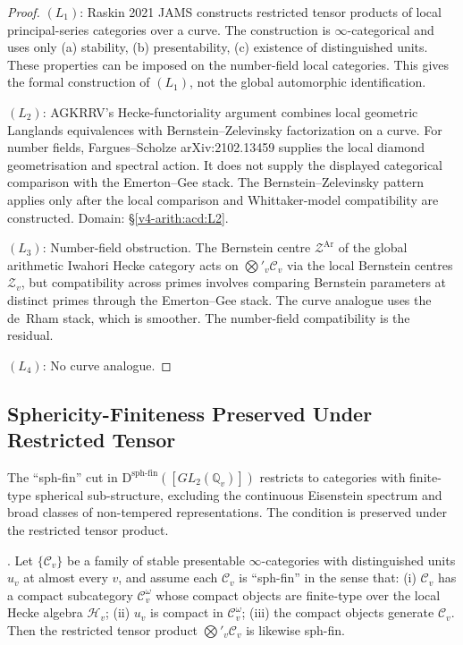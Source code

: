 \begin{proof}
\((L_{1})\): Raskin 2021 JAMS constructs restricted tensor products of
local principal-series categories over a curve. The construction is
\(\infty\)-categorical and uses only (a) stability, (b) presentability,
(c) existence of distinguished units. These properties can be imposed
on the number-field local categories. This gives the formal construction
of \((L_{1})\), not the global automorphic identification.

\((L_{2})\): AGKRRV's Hecke-functoriality argument combines local
geometric Langlands equivalences with Bernstein--Zelevinsky
factorization on a curve. For number fields,
Fargues--Scholze arXiv:2102.13459 supplies the local diamond
geometrisation and spectral action. It does not supply the displayed
categorical comparison with the Emerton--Gee stack. The
Bernstein--Zelevinsky pattern applies only after the local
comparison and Whittaker-model compatibility are constructed. Domain:
\S\ref{v4-arith:acd:L2}.

\((L_{3})\): Number-field obstruction. The Bernstein centre
\(\mathcal{Z}^{\mathrm{Ar}}\) of the global arithmetic Iwahori Hecke
category acts on \(\bigotimes'_{v}\mathcal{C}_{v}\) via the local
Bernstein centres \(\mathcal{Z}_{v}\), but compatibility across primes
involves comparing Bernstein parameters at distinct primes through
the Emerton--Gee stack. The curve analogue uses the de~Rham
stack, which is smoother. The number-field compatibility is the
residual.

\((L_{4})\): No curve analogue.
\end{proof}

\subsection{Sphericity-Finiteness Preserved Under Restricted Tensor}
\label{v4-arith:acd:obstruction-3}

The ``sph-fin'' cut in
\(\mathrm{D}^{\mathrm{sph\text{-}fin}}([GL_{2}(\mathbb{Q}_{v})])\)
restricts to categories with finite-type spherical sub-structure,
excluding the continuous Eisenstein spectrum and broad classes of
non-tempered representations. The condition is preserved under the
restricted tensor product.

\begin{lemma}
\label{v4-arith:acd:lem:sph-fin-preservation}
\ClaimStatusProvedHere. Let \(\{\mathcal{C}_{v}\}\) be a family of
stable presentable \(\infty\)-categories with distinguished units
\(u_{v}\) at almost every \(v\), and assume each \(\mathcal{C}_{v}\) is
``sph-fin'' in the sense that: (i) \(\mathcal{C}_{v}\) has a compact
subcategory \(\mathcal{C}_{v}^{\omega}\) whose compact objects are
finite-type over the local Hecke algebra \(\mathcal{H}_{v}\); (ii)
\(u_{v}\) is compact in \(\mathcal{C}_{v}^{\omega}\); (iii) the compact
objects generate \(\mathcal{C}_{v}\). Then the restricted tensor
product \(\bigotimes'_{v}\mathcal{C}_{v}\) is likewise sph-fin.
\end{lemma}

